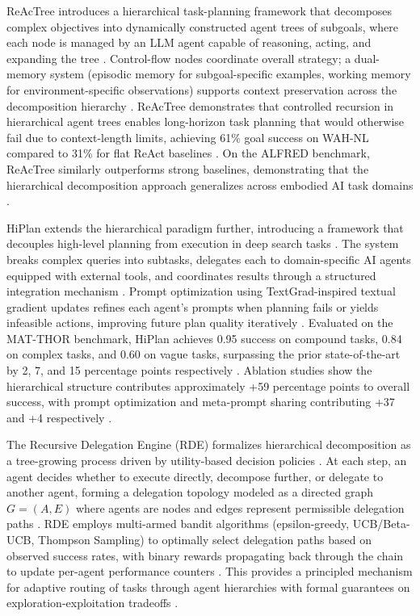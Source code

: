 \documentclass[11pt,oneside]{article}
\begin{document}
ReAcTree introduces a hierarchical task-planning framework that decomposes complex objectives into dynamically constructed agent trees of subgoals, where each node is managed by an LLM agent capable of reasoning, acting, and expanding the tree \cite{reactree2025arxiv}. Control-flow nodes coordinate overall strategy; a dual-memory system (episodic memory for subgoal-specific examples, working memory for environment-specific observations) supports context preservation across the decomposition hierarchy \cite{reactree2025arxiv}. ReAcTree demonstrates that controlled recursion in hierarchical agent trees enables long-horizon task planning that would otherwise fail due to context-length limits, achieving 61\% goal success on WAH-NL compared to 31\% for flat ReAct baselines \cite{reactree2025arxiv}. On the ALFRED benchmark, ReAcTree similarly outperforms strong baselines, demonstrating that the hierarchical decomposition approach generalizes across embodied AI task domains \cite{reactree2025arxiv}.

HiPlan extends the hierarchical paradigm further, introducing a framework that decouples high-level planning from execution in deep search tasks \cite{hiplan2025arxiv}. The system breaks complex queries into subtasks, delegates each to domain-specific AI agents equipped with external tools, and coordinates results through a structured integration mechanism \cite{hiplan2025arxiv}. Prompt optimization using TextGrad-inspired textual gradient updates refines each agent's prompts when planning fails or yields infeasible actions, improving future plan quality iteratively \cite{hiplan2025arxiv}. Evaluated on the MAT-THOR benchmark, HiPlan achieves 0.95 success on compound tasks, 0.84 on complex tasks, and 0.60 on vague tasks, surpassing the prior state-of-the-art by 2, 7, and 15 percentage points respectively \cite{hiplan2025arxiv}. Ablation studies show the hierarchical structure contributes approximately +59 percentage points to overall success, with prompt optimization and meta-prompt sharing contributing +37 and +4 respectively \cite{hiplan2025arxiv}.

The Recursive Delegation Engine (RDE) formalizes hierarchical decomposition as a tree-growing process driven by utility-based decision policies \cite{rde2025arxiv}. At each step, an agent decides whether to execute directly, decompose further, or delegate to another agent, forming a delegation topology modeled as a directed graph $G = (A, E)$ where agents are nodes and edges represent permissible delegation paths \cite{rde2025arxiv}. RDE employs multi-armed bandit algorithms (epsilon-greedy, UCB/Beta-UCB, Thompson Sampling) to optimally select delegation paths based on observed success rates, with binary rewards propagating back through the chain to update per-agent performance counters \cite{rde2025arxiv}. This provides a principled mechanism for adaptive routing of tasks through agent hierarchies with formal guarantees on exploration-exploitation tradeoffs \cite{rde2025arxiv}.
\end{document}
